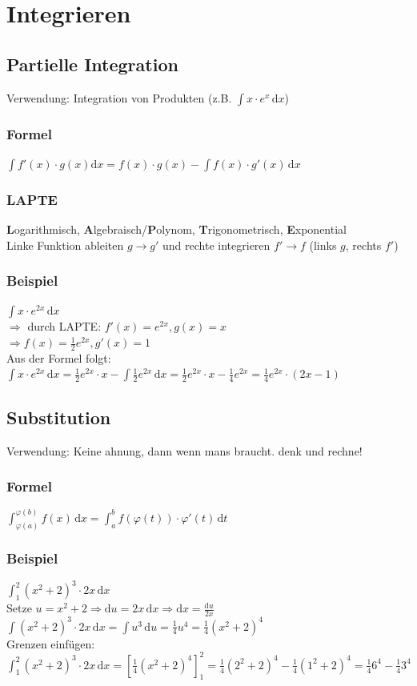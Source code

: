 \documentclass[a4paper,portrait]{scrartcl}
\begin{document}
\section{Integrieren}
\subsection{Partielle Integration}
Verwendung: Integration von Produkten (z.B. $ \int \! x \cdot e^x \, \mathrm{d}x $)
\subsubsection*{Formel}
$ \int f'(x) \cdot g(x) \mathrm{d}x = f(x) \cdot g(x) - \int f(x) \cdot g'(x) \, \mathrm{d}x$
\subsubsection*{LAPTE}
\textbf{L}ogarithmisch, \textbf{A}lgebraisch/\textbf{P}olynom, \textbf{T}rigonometrisch, \textbf{E}xponential \\
Linke Funktion ableiten $g \rightarrow g'$ und rechte integrieren $f'\rightarrow f$ (links $g$, rechts $f'$)
\subsubsection*{Beispiel}
$ \int \! x \cdot e^{2x} \, \mathrm{d}x$ \\
$\Rightarrow$ durch LAPTE: $f'(x) = e^{2x}, g(x) = x$ \\
$\Rightarrow f(x) = \frac{1}{2} e^{2x}, g'(x) = 1 $  \\
Aus der Formel folgt: 
$ \int \! x \cdot e^{2x} \, \mathrm{d}x = \frac{1}{2} e^{2x} \cdot x - \int \! \frac{1}{2} e^{2x} \, \mathrm{d}x = \frac{1}{2} e^{2x} \cdot x - \frac{1}{4} e^{2x} = \frac{1}{4} e^{2x} \cdot (2x-1)$
\subsection{Substitution}
Verwendung: Keine ahnung, dann wenn mans braucht. denk und rechne!
\subsubsection*{Formel}
$ \int_{\varphi(a)}^{\varphi(b)} \! f(x) \,\mathrm{d}x = \int_{a}^{b} \! f(\varphi(t)) \cdot \varphi'(t) \,\mathrm{d}t$
\subsubsection*{Beispiel}
$ \int_{1}^{2} \!(x^2+2)^3 \cdot 2x \,\mathrm{d}x $ \\
Setze $ u = x^2 + 2 \Rightarrow \mathrm{d}u = 2x \,\mathrm{d}x \Rightarrow \mathrm{d}x = \frac{\mathrm{d}u}{2x}$ \\
$ \int \!(x^2+2)^3 \cdot 2x \,\mathrm{d}x = \int \! u^3 \,\mathrm{d}u = \frac{1}{4}u^4 = \frac{1}{4}(x^2+2)^4$ \\
Grenzen einfügen: $ \int_{1}^{2} \!(x^2+2)^3 \cdot 2x \,\mathrm{d}x = \left[ \frac{1}{4}(x^2+2)^4 \right]_1^2 = \frac{1}{4}(2^2+2)^4 - \frac{1}{4}(1^2+2)^4 = \frac{1}{4}6^4 - \frac{1}{4}3^4$
\end{document}
